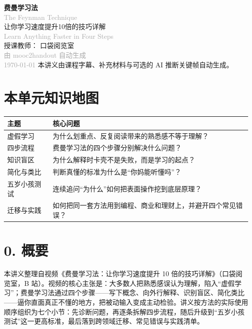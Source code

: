 \documentclass[UTF8,a4paper,11pt]{ctexart}
\begin{document}
\begin{center}
  \vspace*{2cm}
  {\Huge\bfseries\color{accent} 费曼学习法}\\[0.3cm]
  {\small\textcolor{darkgray}{The Feynman Technique}}\\[0.8cm]
  {\LARGE 让你学习速度提升10倍的技巧详解}\\[0.3cm]
  {\small\textcolor{darkgray}{Learn Anything Faster in Four Steps}}\\[1.2cm]
  {\large 授课教师： 口袋阅览室}\\[0.5cm]
  {\large\textcolor{darkgray}{由 mooc2handout 自动生成}}\\[0.3cm]
  {\small\textcolor{darkgray}{\today}}
  \vfill
  {\small 本讲义由课程字幕、补充材料与可选的 AI 推断关键帧自动生成。}
\end{center}
\newpage

\tableofcontents
\newpage

\section*{本单元知识地图}
\begin{longtable}{p{3.1cm}p{10.2cm}}
\toprule
主题 & 核心问题 \\
\midrule
虚假学习 & 为什么划重点、反复阅读带来的熟悉感不等于理解？ \\
四步流程 & 费曼学习法的四个步骤分别解决什么问题？ \\
知识盲区 & 为什么解释时卡壳不是失败，而是学习的起点？ \\
简化与类比 & 判断真懂的标准为什么是“你妈能听懂吗”？ \\
五岁小孩测试 & 连续追问“为什么”如何把表面操作挖到底层原理？ \\
迁移与实践 & 如何把同一套方法用到编程、商业和理财上，并避开四个常见错误？ \\
\bottomrule
\end{longtable}

\section*{0. 概要}
本讲义整理自视频《费曼学习法：让你学习速度提升 10 倍的技巧详解》（口袋阅览室，B 站）。视频的核心主张是：大多数人把熟悉感误认为理解，陷入“虚假学习”；费曼学习法通过四个步骤——写下概念、向外行解释、识别盲区、简化类比——逼你直面真正不懂的地方，把被动输入变成主动检验。讲义按方法的实际使用顺序组织为七个小节：先诊断问题，再逐条拆解四步流程，随后升级到“五岁小孩测试”这一更高标准，最后落到跨领域迁移、常见错误与实践清单。
\end{document}
